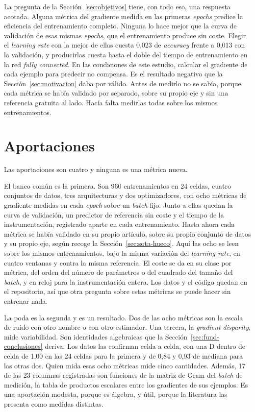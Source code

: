 La pregunta de la Sección~\ref{sec:objetivos} tiene, con todo eso, una respuesta acotada. Alguna métrica del gradiente medida en las primeras \emph{epochs} predice la eficiencia del entrenamiento completo. Ninguna lo hace mejor que la curva de validación de esas mismas \emph{epochs}, que el entrenamiento produce sin coste. Elegir el \emph{learning rate} con la mejor de ellas cuesta 0,023 de \emph{accuracy} frente a 0,013 con la validación, y producirlas cuesta hasta el doble del tiempo de entrenamiento en la red \emph{fully connected}. En las condiciones de este estudio, calcular el gradiente de cada ejemplo para predecir no compensa. Es el resultado negativo que la Sección~\ref{sec:motivacion} daba por válido. Antes de medirlo no se sabía, porque cada métrica se había validado por separado, sobre su propio eje y sin una referencia gratuita al lado. Hacía falta medirlas todas sobre los mismos entrenamientos.

\section{Aportaciones}
\label{sec:concl-aportaciones}

Las aportaciones son cuatro y ninguna es una métrica nueva.

El banco común es la primera. Son 960 entrenamientos en 24 celdas, cuatro conjuntos de datos, tres arquitecturas y dos optimizadores, con ocho métricas de gradiente medidas en cada \emph{epoch} sobre un \emph{batch} fijo. Junto a ellas quedan la curva de validación, un predictor de referencia sin coste y el tiempo de la instrumentación, registrado aparte en cada entrenamiento. Hasta ahora cada métrica se había validado en su propio artículo, sobre su propio conjunto de datos y su propio eje, según recoge la Sección~\ref{sec:sota-hueco}. Aquí las ocho se leen sobre los mismos entrenamientos, bajo la misma variación del \emph{learning rate}, en cuatro ventanas y contra la misma referencia. El coste se da en su clase por métrica, del orden del número de parámetros o del cuadrado del tamaño del \emph{batch}, y en reloj para la instrumentación entera. Los datos y el código quedan en el repositorio, así que otra pregunta sobre estas métricas se puede hacer sin entrenar nada.

La poda es la segunda y es un resultado. Dos de las ocho métricas son la escala de ruido con otro nombre o con otro estimador. Una tercera, la \emph{gradient disparity}, mide variabilidad. Son identidades algebraicas que la Sección~\ref{sec:fund-conclusiones} deriva. Los datos las confirman celda a celda, con una D dentro de celda de 1,00 en las 24 celdas para la primera y de 0,84 y 0,93 de mediana para las otras dos. Quien mida esas ocho métricas mide cinco cantidades. Además, 17 de las 23 columnas registradas son funciones de la matriz de Gram del \emph{batch} de medición, la tabla de productos escalares entre los gradientes de sus ejemplos. Es una aportación modesta, porque es álgebra, y útil, porque la literatura las presenta como medidas distintas.

